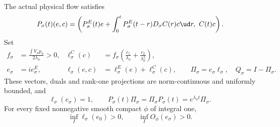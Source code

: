 \begin{proposition}
  \label{P:compact-F-projection}
  The actual physical flow satisfies
  \begin{equation}\label{E:compact-F-block}
    P_\sigma(t)(e,c)
    =\left(P_\sigma^E(t)e+
    \int_0^tP_\sigma^E(t-r)D_\sigma C(r)c\ud r,\ C(t)c\right).
  \end{equation}
  Set
  \begin{align}
    f_\sigma&=\frac{\int V_\sigma p_\sigma}{2\lambda_\sigma}>0,
    &\ell_\sigma^C(c)&=
    f_\sigma\left(\frac{c_1}{\lambda_\sigma}
    +\frac{c_2}{\lambda_\sigma^2}\right),
    \label{E:compact-constant-dual}\\
    e_\sigma&=ie_\sigma^E,
    &\ell_\sigma(e,c)&=\ell_\sigma^E(e)+\ell_\sigma^C(c),\qquad
    \Pi_\sigma=e_\sigma\ell_\sigma,\quad Q_\sigma=I-\Pi_\sigma.
    \label{E:compact-F-projection}
  \end{align}
  These vectors, duals and rank-one projections are norm-continuous
  and uniformly bounded, and
  \begin{equation}\label{E:compact-F-eigen}
    \ell_\sigma(e_\sigma)=1,\qquad
    P_\sigma(t)\Pi_\sigma=\Pi_\sigma P_\sigma(t)
    =e^{\lambda_\sigma t}\Pi_\sigma.
  \end{equation}
  For every fixed nonnegative smooth compact $\phi$ of integral one,
  \begin{equation}\label{E:compact-positive-margins}
    \inf_I\ell_\sigma(e_0)>0,\qquad
    \inf_I O_\phi(e_\sigma)>0.
  \end{equation}
\end{proposition}

